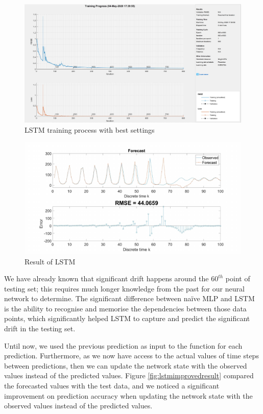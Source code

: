\documentclass{article}
\begin{document}
\begin{figure}[h!]
  \centering
  \includegraphics[width=\textwidth]{lab2/lstmfinal.pdf}
  \caption{LSTM training process with best settings}
  \label{fig:lstmfinal}
\end{figure}

\begin{figure}[h!]
  \centering
  \includegraphics[width=\textwidth]{lab2/lstmresult.pdf}
  \caption{Result of LSTM}
  \label{fig:lstmresult}
\end{figure}

We have already known that significant drift happens around the $60^{th}$ point of testing set; this requires much longer knowledge from the past for our neural network to determine. The significant difference between na\"ive MLP and LSTM is the ability to recognise and memorise the dependencies between those data points, which significantly helped LSTM to capture and predict the significant drift in the testing set.

Until now, we used the previous prediction as input to the function for each prediction. Furthermore, as we now have access to the actual values of time steps between predictions, then we can update the network state with the observed values instead of the predicted values. Figure \ref{fig:lstmimprovedresult} compared the forecasted values with the test data, and we noticed a significant improvement on prediction accuracy when updating the network state with the observed values instead of the predicted values.
\end{document}

